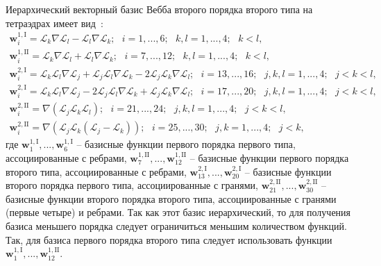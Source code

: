 \documentclass[a4paper,14pt]{article}
\begin{document}
Иерархический векторный базис Вебба второго порядка второго типа на тетраэдрах имеет вид~\citep{mikhajlova}:
\begin{equation*}
	\begin{matrix}
		\displaystyle
		\mathbf{w}_{i}^{1,\mathrm{I}} = \mathcal{L}_k \nabla \mathcal{L}_l - \mathcal{L}_l \nabla \mathcal{L}_k ;
		\scriptstyle
		\text{~~} i = 1, ..., 6 ; \text{~~} k, l = 1, ..., 4 ; \text{~~} k < l ,\\
		\displaystyle
		\mathbf{w}_{i}^{1,\mathrm{II}} = \mathcal{L}_k \nabla \mathcal{L}_l + \mathcal{L}_l \nabla \mathcal{L}_k ;
		\scriptstyle
		\text{~~} i = 7, ..., 12 ; \text{~~} k, l = 1, ..., 4 ; \text{~~} k < l ,\\
		\displaystyle
		\mathbf{w}_{i}^{2,\mathrm{I}} = \mathcal{L}_k \mathcal{L}_l \nabla \mathcal{L}_j + \mathcal{L}_j \mathcal{L}_l \nabla \mathcal{L}_k - 2 \mathcal{L}_j \mathcal{L}_k \nabla \mathcal{L}_l ;
		\scriptstyle
		\text{~~} i = 13, ..., 16 ; \text{~~} j, k, l = 1, ..., 4 ; \text{~~} j < k < l ,\\
		\displaystyle
		\mathbf{w}_{i}^{2,\mathrm{I}} = \mathcal{L}_k \mathcal{L}_l \nabla \mathcal{L}_j - 2 \mathcal{L}_j \mathcal{L}_l \nabla \mathcal{L}_k + \mathcal{L}_j \mathcal{L}_k \nabla \mathcal{L}_l ;
		\scriptstyle
		\text{~~} i = 17, ..., 20 ; \text{~~} j, k, l = 1, ..., 4 ; \text{~~} j < k < l ,\\
		\displaystyle
		\mathbf{w}_{i}^{2,\mathrm{II}} = \nabla ( \mathcal{L}_j \mathcal{L}_k \mathcal{L}_l ) ;
		\scriptstyle
		\text{~~} i = 21, ..., 24 ; \text{~~} j, k, l = 1, ..., 4 ; \text{~~} j < k < l ,\\
		\displaystyle
		\mathbf{w}_{i}^{2,\mathrm{II}} = \nabla ( \mathcal{L}_j \mathcal{L}_k ( \mathcal{L}_j - \mathcal{L}_k ) ) ;
		\scriptstyle
		\text{~~} i = 25, ..., 30 ; \text{~~} j, k = 1, ..., 4 ; \text{~~} j < k ,
	\end{matrix}
	\label{eq:basis}
\end{equation*}
где $\mathbf{w}_{1}^{1,\mathrm{I}}, ..., \mathbf{w}_{6}^{1,\mathrm{I}}$ – базисные функции первого порядка первого типа, ассоциированные с ребрами, $\mathbf{w}_{7}^{1,\mathrm{II}}, ..., \mathbf{w}_{12}^{1,\mathrm{II}}$ – базисные функции первого порядка второго типа, ассоциированные с ребрами, $\mathbf{w}_{13}^{2,\mathrm{I}}, ..., \mathbf{w}_{20}^{2,\mathrm{I}}$ – базисные функции второго порядка первого типа, ассоциированные с гранями, $\mathbf{w}_{21}^{2,\mathrm{II}}, ..., \mathbf{w}_{30}^{2,\mathrm{II}}$ – базисные функции второго порядка второго типа, ассоциированные с гранями (первые четыре) и ребрами. Так как этот базис иерархический, то для получения базиса меньшего порядка следует ограничиться меньшим количеством функций. Так, для базиса первого порядка второго  типа следует использовать функции $\mathbf{w}_{1}^{1,\mathrm{I}}, ..., \mathbf{w}_{12}^{1,\mathrm{II}}$.
\end{document}
